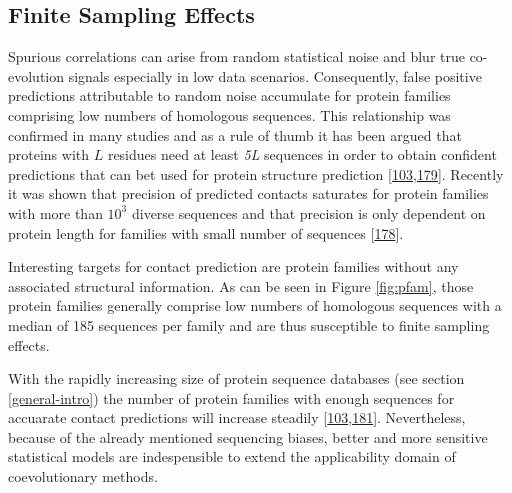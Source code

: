 \documentclass[11pt,a4paper,twoside]{book}
\theoremstyle{definition}
\theoremstyle{definition}
\theoremstyle{remark}
\begin{document}
\subsection{Finite Sampling Effects}\label{finite-sampling-effects}

Spurious correlations can arise from random statistical noise and blur
true co-evolution signals especially in low data scenarios.
Consequently, false positive predictions attributable to random noise
accumulate for protein families comprising low numbers of homologous
sequences. This relationship was confirmed in many studies and as a rule
of thumb it has been argued that proteins with \(L\) residues need at
least \emph{5L} sequences in order to obtain confident predictions that
can bet used for protein structure prediction
{[}\protect\hyperlink{ref-Kamisetty2013}{103},\protect\hyperlink{ref-Marks2012}{179}{]}.
Recently it was shown that precision of predicted contacts saturates for
protein families with more than \(10^3\) diverse sequences and that
precision is only dependent on protein length for families with small
number of sequences {[}\protect\hyperlink{ref-Anishchenko2017}{178}{]}.

Interesting targets for contact prediction are protein families without
any associated structural information. As can be seen in Figure
\ref{fig:pfam}, those protein families generally comprise low numbers of
homologous sequences with a median of 185 sequences per family and are
thus susceptible to finite sampling effects.

With the rapidly increasing size of protein sequence databases (see
section \ref{general-intro}) the number of protein families with enough
sequences for accuarate contact predictions will increase steadily
{[}\protect\hyperlink{ref-Kamisetty2013}{103},\protect\hyperlink{ref-TheUniProtConsortium2013}{181}{]}.
Nevertheless, because of the already mentioned sequencing biases, better
and more sensitive statistical models are indespensible to extend the
applicability domain of coevolutionary methods.
\end{document}
